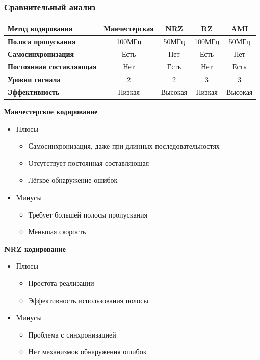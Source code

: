 \documentclass[12pt,a4paper]{report}
\begin{document}
\subsubsection*{Сравнительный анализ}
\begin{tabular}{|l|c|c|c|c|}
    \hline
    \textbf{Метод кодирования} & Манчестерская & NRZ & RZ & AMI \\
    \hline
    \textbf{Полоса пропускания} & 100МГц & 50МГц & 100МГц & 50МГц \\
    \hline
    \textbf{Самосинхронизация} & Есть & Нет & Есть & Нет \\
    \hline
    \textbf{Постоянная составляющая} & Нет & Есть & Нет & Есть \\
    \hline
    \textbf{Уровни сигнала} & 2 & 2 & 3 & 3 \\
    \hline
    \textbf{Эффективность} & Низкая & Высокая & Низкая & Высокая \\
    \hline
\end{tabular}
\hfill\break
\textbf{Манчестерское кодирование}
\begin{itemize}
    \item Плюсы
    \begin{itemize}
        \item Самосинхронизация, даже при длинных последовательностях
        \item Отсутствует постоянная составляющая
        \item Лёгкое обнаружение ошибок
    \end{itemize}
    \item Минусы
    \begin{itemize}
        \item Требует большей полосы пропускания
        \item Меньшая скорость
    \end{itemize}
\end{itemize}
\textbf{NRZ кодирование}
\begin{itemize}
    \item Плюсы
    \begin{itemize}
        \item Простота реализации
        \item Эффективность использования полосы
    \end{itemize}
    \item Минусы
    \begin{itemize}
        \item Проблема с синхронизацией
        \item Нет механизмов обнаружения ошибок
    \end{itemize}
\end{itemize}
\end{document}
